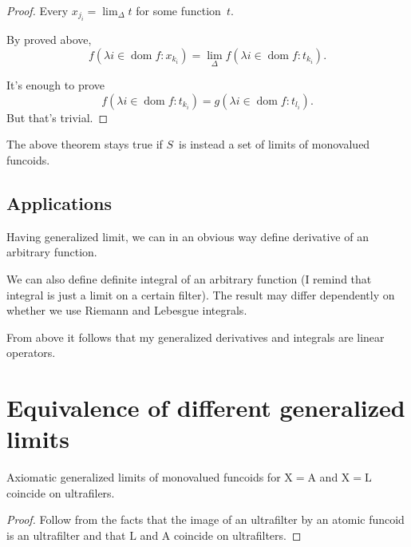 \begin{proof}
Every $x_{j_i} = \lim_{\Delta} t$ for some function~$t$.

By proved above, \[ f (\lambda i \in \operatorname{dom} f : x_{k_i}) = \lim_{\Delta} f(\lambda i \in \operatorname{dom} f : t_{k_i}). \]

It's enough to prove \[ f(\lambda i \in \operatorname{dom} f : t_{k_i}) = g(\lambda i \in \operatorname{dom} f : t_{l_i}). \]
But that's trivial.
\end{proof}

\begin{conjecture}
The above theorem stays true if $S$~is instead a set of limits of monovalued funcoids.
\end{conjecture}

\section{Applications}

Having generalized limit, we can in an obvious way define derivative of an arbitrary function.

We can also define definite integral of an arbitrary function (I remind that integral is just a limit on a certain filter). The result may differ dependently on whether we use Riemann and Lebesgue integrals.

From above it follows that my generalized derivatives and integrals are linear operators.

\chapter{Equivalence of different generalized limits}

\begin{prop}
Axiomatic generalized limits of monovalued funcoids for 
$\mathrm{X}=\mathrm{A}$ and $\mathrm{X}=\mathrm{L}$ coincide on ultrafilers.
\end{prop}

\begin{proof}
Follow from the facts that the image of an ultrafilter by an atomic funcoid is an ultrafilter and that $\mathrm{L}$ and $\mathrm{A}$ coincide on ultrafilters.
\end{proof}


